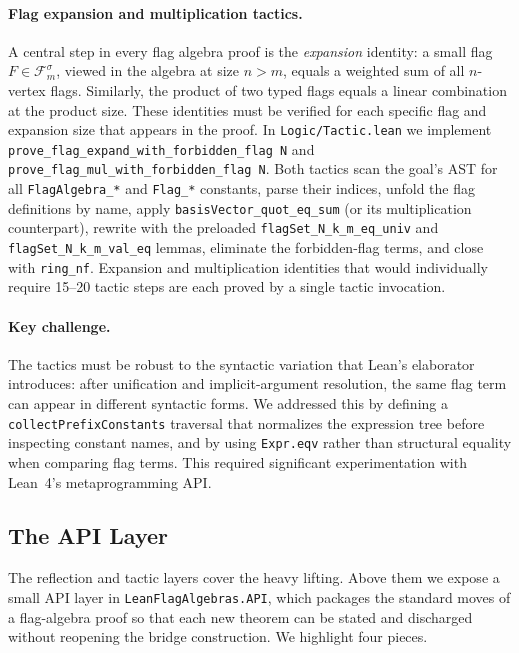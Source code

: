 \documentclass{article}
\newcommand{\Flag}[1]{\mathcal{F}^{#1}}
\newcommand{\lean}[1]{\texttt{#1}}
\begin{document}
\paragraph{Flag expansion and multiplication tactics.}
A central step in every flag algebra proof is the \emph{expansion} identity:
a small flag $F \in \Flag{\sigma}_m$, viewed in the algebra at size $n > m$,
equals a weighted sum of all $n$-vertex flags.  Similarly, the product of
two typed flags equals a linear combination at the product size.  These
identities must be verified for each specific flag and expansion size that
appears in the proof.  In \lean{Logic/Tactic.lean} we implement
\lean{prove\_flag\_expand\_with\_forbidden\_flag N} and
\lean{prove\_flag\_mul\_with\_forbidden\_flag N}.  Both tactics scan the
goal's AST for all \lean{FlagAlgebra\_*} and \lean{Flag\_*} constants,
parse their indices, unfold the flag definitions by name, apply
\lean{basisVector\_quot\_eq\_sum} (or its multiplication counterpart), rewrite
with the preloaded \lean{flagSet\_N\_k\_m\_eq\_univ} and
\lean{flagSet\_N\_k\_m\_val\_eq} lemmas, eliminate the forbidden-flag terms,
and close with \lean{ring\_nf}.  Expansion and multiplication identities
that would individually require 15--20 tactic steps are each proved by a
single tactic invocation.

\paragraph{Key challenge.}
The tactics must be robust to the syntactic variation that Lean's elaborator
introduces: after unification and implicit-argument resolution, the same
flag term can appear in different syntactic forms.  We addressed this by
defining a \lean{collectPrefixConstants} traversal that normalizes the
expression tree before inspecting constant names, and by using
\lean{Expr.eqv} rather than structural equality when comparing flag terms.
This required significant experimentation with Lean~4's metaprogramming API.

\subsection{The API Layer}
\label{sec:api}

The reflection and tactic layers cover the heavy lifting.  Above them we
expose a small API layer in \lean{LeanFlagAlgebras.API}, which packages the
standard moves of a flag-algebra proof so that each new theorem can be stated
and discharged without reopening the bridge construction.  We highlight four
pieces.
\end{document}
